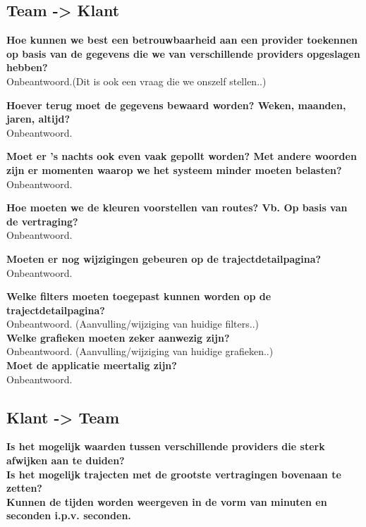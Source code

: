 \documentclass[a4paper]{article}
\begin{document}
\subsection{Team -> Klant}

\textbf{Hoe kunnen we best een betrouwbaarheid aan een provider toekennen op basis van de gegevens die we van verschillende providers opgeslagen hebben?}\\
Onbeantwoord.(Dit is ook een vraag die we onszelf stellen..)

\textbf{Hoever terug moet de gegevens bewaard worden? Weken, maanden, jaren, altijd?}\\
Onbeantwoord.

\textbf{Moet er ’s nachts ook even vaak gepollt worden? Met andere woorden zijn er momenten waarop we het systeem minder moeten belasten?}\\
Onbeantwoord.

\textbf{Hoe moeten we de kleuren voorstellen van routes? Vb. Op basis van de vertraging?}\\
Onbeantwoord.

\textbf{Moeten er nog wijzigingen gebeuren op de trajectdetailpagina?}\\
Onbeantwoord.

\textbf{Welke filters moeten toegepast kunnen worden op de trajectdetailpagina?}\\
Onbeantwoord. (Aanvulling/wijziging van huidige filters..)\\

\textbf{Welke grafieken moeten zeker aanwezig zijn?}\\
Onbeantwoord. (Aanvulling/wijziging van huidige grafieken..)\\

\textbf{Moet de applicatie meertalig zijn?}\\
Onbeantwoord.

\newpage

\subsection{Klant -> Team}

\textbf{Is het mogelijk waarden tussen verschillende providers die sterk afwijken aan te duiden?}\\

\textbf{Is het mogelijk trajecten met de grootste vertragingen bovenaan te zetten?}\\

\textbf{Kunnen de tijden worden weergeven in de vorm van minuten en seconden i.p.v. seconden.}\\
\end{document}
